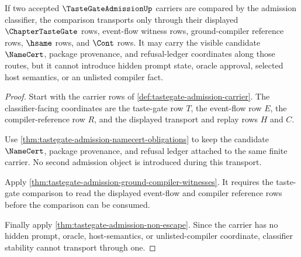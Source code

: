 \begin{theorem}
\label{thm:tastegate-admission-classifier-stability-obligation}
If two accepted $\TasteGateAdmissionUp$ carriers are compared by the admission
classifier, the comparison transports only through their displayed
$\ChapterTasteGate$ rows, event-flow witness rows, ground-compiler reference
rows, $\hsame$ rows, and $\Cont$ rows. It may carry the visible candidate
$\NameCert$, package provenance, and refusal-ledger coordinates along those
routes, but it cannot introduce hidden prompt state, oracle approval, selected
host semantics, or an unlisted compiler fact.
\end{theorem}
\begin{proof}
Start with the carrier rows of \autoref{def:tastegate-admission-carrier}. The
classifier-facing coordinates are the taste-gate row $T$, the event-flow row
$E$, the compiler-reference row $R$, and the displayed transport and replay
rows $H$ and $C$.

Use \autoref{thm:tastegate-admission-namecert-obligations} to keep the
candidate $\NameCert$, package provenance, and refusal ledger attached to the
same finite carrier. No second admission object is introduced during this
transport.

Apply \autoref{thm:tastegate-admission-ground-compiler-witnesses}. It requires
the taste-gate comparison to read the displayed event-flow and compiler
reference rows before the comparison can be consumed.

Finally apply \autoref{thm:tastegate-admission-non-escape}. Since the carrier
has no hidden prompt, oracle, host-semantics, or unlisted-compiler coordinate,
classifier stability cannot transport through one.
\end{proof}

